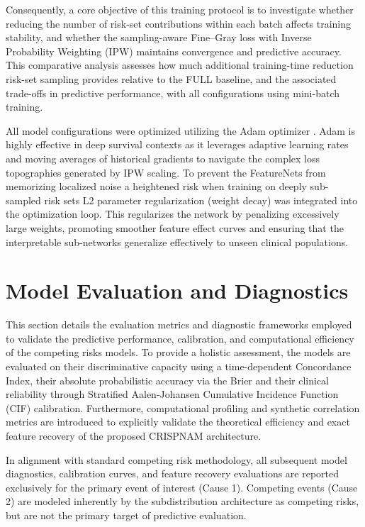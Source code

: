 \documentclass[a4paper,twoside,12pt]{report}
\begin{document}
Consequently, a core objective of this training protocol is to investigate whether reducing the number of risk-set contributions within each batch affects training stability, and whether the sampling-aware Fine--Gray loss with Inverse Probability Weighting (IPW) maintains convergence and predictive accuracy. This comparative analysis assesses how much additional training-time reduction risk-set sampling provides relative to the FULL baseline, and the associated trade-offs in predictive performance, with all configurations using mini-batch training.


All model configurations were optimized utilizing the Adam optimizer \citep{kingma2014adam}. Adam is highly effective in deep survival contexts as it leverages adaptive learning rates and moving averages of historical gradients to navigate the complex loss topographies generated by IPW scaling. To prevent the FeatureNets from memorizing localized noise a heightened risk when training on deeply sub-sampled risk sets L2 parameter regularization (weight decay) was integrated into the optimization loop. This regularizes the network by penalizing excessively large weights, promoting smoother feature effect curves and ensuring that the interpretable sub-networks generalize effectively to unseen clinical populations.


\section{Model Evaluation and Diagnostics}

This section details the evaluation metrics and diagnostic frameworks employed to validate the predictive performance, calibration, and computational efficiency of the competing risks models. To provide a holistic assessment, the models are evaluated on their discriminative capacity using a time-dependent Concordance Index, their absolute probabilistic accuracy via the Brier and their clinical reliability through Stratified Aalen-Johansen Cumulative Incidence Function (CIF) calibration. Furthermore, computational profiling and synthetic correlation metrics are introduced to explicitly validate the theoretical efficiency and exact feature recovery of the proposed CRISPNAM architecture.

In alignment with standard competing risk methodology, all subsequent model diagnostics, calibration curves, and feature recovery evaluations are reported exclusively for the primary event of interest (Cause 1). Competing events (Cause 2) are modeled inherently by the subdistribution architecture as competing risks, but are not the primary target of predictive evaluation.
\end{document}
